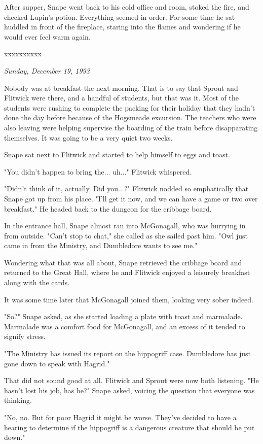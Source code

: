 \documentclass[a4paper,11pt]{article}
\begin{document}
After supper, Snape went back to his cold office and room, stoked the fire, and checked Lupin's potion. Everything seemed in order. For some time he sat huddled in front of the fireplace, staring into the flames and wondering if he would ever feel warm again.

xxxxxxxxxx

\emph{Sunday, December 19, 1993}

Nobody was at breakfast the next morning. That is to say that Sprout and Flitwick were there, and a handful of students, but that was it. Most of the students were rushing to complete the packing for their holiday that they hadn't done the day before because of the Hogsmeade excursion. The teachers who were also leaving were helping supervise the boarding of the train before disapparating themselves. It was going to be a very quiet two weeks.

Snape sat next to Flitwick and started to help himself to eggs and toast.

"You didn't happen to bring the... uh..." Flitwick whispered.

"Didn't think of it, actually. Did you...?" Flitwick nodded so emphatically that Snape got up from his place. "I'll get it now, and we can have a game or two over breakfast." He headed back to the dungeon for the cribbage board.

In the entrance hall, Snape almost ran into McGonagall, who was hurrying in from outside. "Can't stop to chat," she called as she sailed past him. "Owl just came in from the Ministry, and Dumbledore wants to see me."

Wondering what that was all about, Snape retrieved the cribbage board and returned to the Great Hall, where he and Flitwick enjoyed a leisurely breakfast along with the cards.

It was some time later that McGonagall joined them, looking very sober indeed.

"So?" Snape asked, as she started loading a plate with toast and marmalade. Marmalade was a comfort food for McGonagall, and an excess of it tended to signify stress.

"The Ministry has issued its report on the hippogriff case. Dumbledore has just gone down to speak with Hagrid."

That did not sound good at all. Flitwick and Sprout were now both listening. "He hasn't lost his job, has he?" Snape asked, voicing the question that everyone was thinking.

"No, no. But for poor Hagrid it might be worse. They've decided to have a hearing to determine if the hippogriff is a dangerous creature that should be put down."
\end{document}
